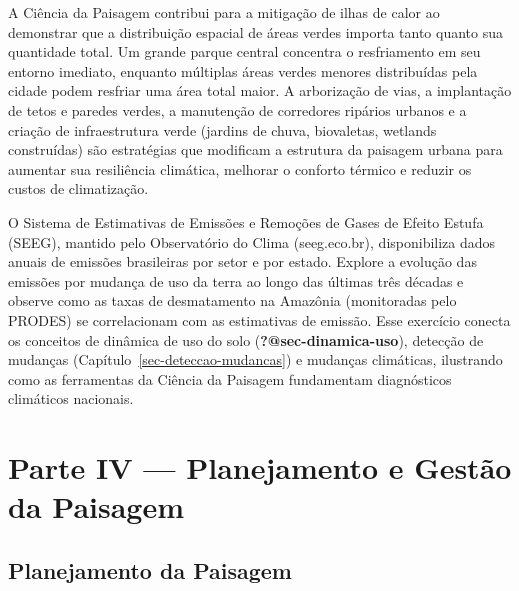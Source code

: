 \documentclass[
  portuguese,
  11pt,
  a4paper,
  open=any]{scrbook}
\begin{document}
A Ciência da Paisagem contribui para a mitigação de ilhas de calor ao
demonstrar que a distribuição espacial de áreas verdes importa tanto
quanto sua quantidade total. Um grande parque central concentra o
resfriamento em seu entorno imediato, enquanto múltiplas áreas verdes
menores distribuídas pela cidade podem resfriar uma área total maior. A
arborização de vias, a implantação de tetos e paredes verdes, a
manutenção de corredores ripários urbanos e a criação de infraestrutura
verde (jardins de chuva, biovaletas, wetlands construídas) são
estratégias que modificam a estrutura da paisagem urbana para aumentar
sua resiliência climática, melhorar o conforto térmico e reduzir os
custos de climatização.

\begin{tcolorbox}[enhanced jigsaw, colbacktitle=quarto-callout-tip-color!10!white, coltitle=black, opacityback=0, breakable, left=2mm, colback=white, bottomtitle=1mm, toptitle=1mm, titlerule=0mm, arc=.35mm, opacitybacktitle=0.6, leftrule=.75mm, colframe=quarto-callout-tip-color-frame, title=\textcolor{quarto-callout-tip-color}{\faLightbulb}\hspace{0.5em}{Para aprofundar}, rightrule=.15mm, bottomrule=.15mm, toprule=.15mm]

O Sistema de Estimativas de Emissões e Remoções de Gases de Efeito
Estufa (SEEG), mantido pelo Observatório do Clima (seeg.eco.br),
disponibiliza dados anuais de emissões brasileiras por setor e por
estado. Explore a evolução das emissões por mudança de uso da terra ao
longo das últimas três décadas e observe como as taxas de desmatamento
na Amazônia (monitoradas pelo PRODES) se correlacionam com as
estimativas de emissão. Esse exercício conecta os conceitos de dinâmica
de uso do solo (\textbf{?@sec-dinamica-uso}), detecção de mudanças
(Capítulo~\ref{sec-deteccao-mudancas}) e mudanças climáticas, ilustrando
como as ferramentas da Ciência da Paisagem fundamentam diagnósticos
climáticos nacionais.

\end{tcolorbox}

\part{Parte IV --- Planejamento e Gestão da Paisagem}

\chapter{Planejamento da Paisagem}\label{sec-planejamento}
\end{document}
